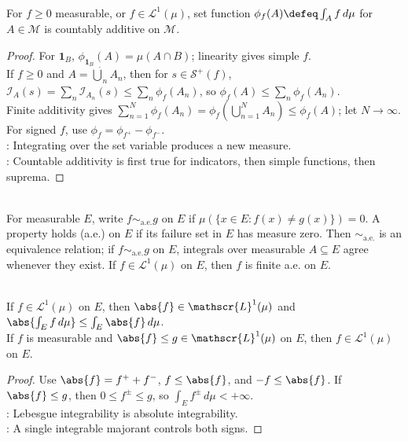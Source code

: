 \begin{theorem} \label{thm:integral-countably-additive-set-function} \\
For $f\geq0$ measurable, or $f\in\mathscr{L}^1(\mu)$, set function $\phi_f(A)\defeq\int_A f\,d\mu$ for $A\in\mathcal{M}$ is countably additive on $\mathcal{M}$.
\begin{proof}
For $\mathbf{1}_B$, $\phi_{\mathbf{1}_B}(A)=\mu(A\cap B)$; linearity gives simple $f$.\\
If $f\geq0$ and $A=\dot\bigcup_nA_n$, then for $s\in\mathcal{S}^+(f)$, $\mathcal{I}_A(s)=\sum\limits_n\mathcal{I}_{A_n}(s)\leq\sum\limits_n\phi_f(A_n)$, so $\phi_f(A)\leq\sum\limits_n\phi_f(A_n)$.\\
Finite additivity gives $\sum\limits_{n=1}^{N}\phi_f(A_n)=\phi_f(\bigcup\limits_{n=1}^{N}A_n)\leq\phi_f(A)$; let $N\to\infty$. For signed $f$, use $\phi_f=\phi_{f^+}-\phi_{f^-}$.\\
: Integrating over the set variable produces a new measure.\\
: Countable additivity is first true for indicators, then simple functions, then suprema.
\end{proof}
\end{theorem}

\begin{definition} \label{def:almost-everywhere-and-null-set-invariance} \\
For measurable $E$, write $f\sim_{\mathrm{a.e.}}g$ on $E$ if $\mu(\{x\in E:f(x)\neq g(x)\})=0$. A property holds  (a.e.) on $E$ if its failure set in $E$ has measure zero. Then $\sim_{\mathrm{a.e.}}$ is an equivalence relation; if $f\sim_{\mathrm{a.e.}}g$ on $E$, integrals over measurable $A\subseteq E$ agree whenever they exist. If $f\in\mathscr{L}^1(\mu)$ on $E$, then $f$ is finite a.e. on $E$.
\end{definition}

\begin{theorem} \label{thm:absolute-integrability-and-domination} \\
If $f\in\mathscr{L}^1(\mu)$ on $E$, then $\abs{f}\in\mathscr{L}^1(\mu)$ and $\abs{\int_E f\,d\mu}\leq\int_E\abs{f}\,d\mu$.\\
If $f$ is measurable and $\abs{f}\leq g\in\mathscr{L}^1(\mu)$ on $E$, then $f\in\mathscr{L}^1(\mu)$ on $E$.
\begin{proof}
Use $\abs{f}=f^++f^-$, $f\leq\abs{f}$, and $-f\leq\abs{f}$. If $\abs{f}\leq g$, then $0\leq f^\pm\leq g$, so $\int_Ef^\pm\,d\mu<+\infty$.\\
: Lebesgue integrability is absolute integrability.\\
: A single integrable majorant controls both signs.
\end{proof}
\end{theorem}

